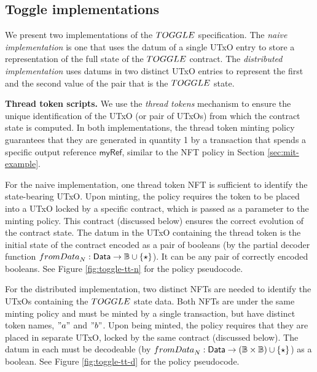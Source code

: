 \subsection{Toggle implementations}

We present two implementations of the $\TOGGLE$ specification. The \emph{naive implementation}
is one that uses the datum of a single UTxO entry to store a representation of the full state of the
$\TOGGLE$ contract. The \emph{distributed implementation} uses datums in two distinct UTxO
entries to represent the first and the second value of the pair that is the $\TOGGLE$ state.

\textbf{Thread token scripts. }
We use the \emph{thread tokens} mechanism \cite{eutxoma} to ensure the unique identification of the
UTxO (or pair of UTxOs) from which the contract state is computed. In both
implementations, the thread token minting policy guarantees that they
are generated in quantity 1 by a transaction that spends a specific output reference $\mathsf{myRef}$,
similar to the NFT policy in Section \ref{sec:mit-example}.

For the naive implementation, one thread token NFT is sufficient to identify the
state-bearing UTxO. Upon minting, the policy requires the token to be placed
into a UTxO locked by a specific contract, which is passed as a parameter to
the minting policy. This contract (discussed below) ensures the correct evolution of the
contract state. The datum in the UTxO containing the thread token is the initial state of the
contract encoded as a pair of booleans
(by the partial decoder function $\fun{fromData}_{N} : \Data \to \B \cup \emptytypeT$).
It can be any pair of correctly encoded booleans.
See Figure \ref{fig:toggle-tt-n} for the policy pseudocode.

For the distributed implementation, two distinct NFTs are needed to identify
the UTxOs containing the $\TOGGLE$ state data. Both NFTs are under the same
minting policy and must be minted by a single transaction, but have distinct token
names, $"a"$ and $"b"$. Upon being minted,
the policy requires that they are placed in separate UTxO, locked by the same
contract (discussed below). The datum in each must be decodeable
(by $\fun{fromData}_{N} : \Data \to (\B \times \B) \cup \emptytypeT$) as a boolean.
See Figure \ref{fig:toggle-tt-d} for the policy pseudocode.

